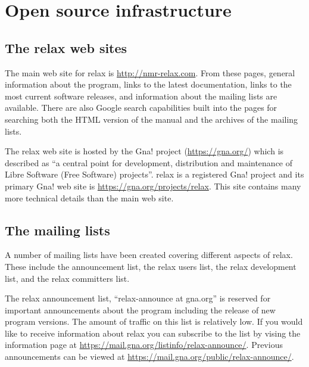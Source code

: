 
\chapter{Open source infrastructure}




\section{The relax web sites}

The main web site for relax is \href{http://nmr-relax.com}{http://nmr-relax.com}.  From these pages, general information about the program, links to the latest documentation, links to the most current software releases, and information about the mailing lists are available.  There are also Google search capabilities built into the pages for searching both the HTML version of the manual and the archives of the mailing lists.

The relax web site is hosted by the Gna! project (\href{https://gna.org/}{https://gna.org/}) which is described as ``a central point for development, distribution and maintenance of Libre Software (Free Software) projects''.  relax is a registered Gna! project and its primary Gna! web site is \href{https://gna.org/projects/relax}{https://gna.org/projects/relax}.  This site contains many more technical details than the main web site.




\section{The mailing lists}

A number of mailing lists have been created covering different aspects of relax.  These include the announcement list, the relax users list, the relax development list, and the relax committers list.

The relax announcement list, ``relax-announce at gna.org'' is reserved for important announcements about the program including the release of new program versions.  The amount of traffic on this list is relatively low.  If you would like to receive information about relax you can subscribe to the list by vising the information page at \href{https://mail.gna.org/listinfo/relax-announce/}{https://mail.gna.org/listinfo/relax-announce/}.  Previous announcements can be viewed at \href{https://mail.gna.org/public/relax-announce/}{https://mail.gna.org/public/relax-announce/}.

